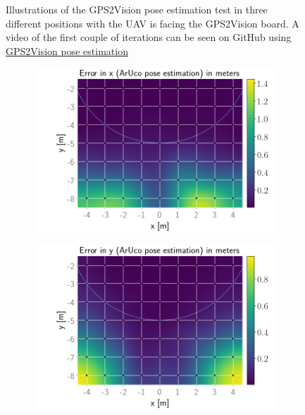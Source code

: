\documentclass[../Head/report.tex]{subfiles}
\begin{document}
\begin{figure}[H]
\begin{subfigure}[t]{.30\textwidth}
        \caption{}
        \label{fig:GPS2Vision_pose_estimation_three}
    \end{subfigure}
    \caption{Illustrations of the GPS2Vision pose estimation test in three different positions with the UAV is facing the GPS2Vision board. A video of the first couple of iterations can be seen on GitHub using \href{https://github.com/Kenil16/master_project/tree/master/test_videos/analyse_GPS2Vision_aruco_pose_estimation}{GPS2Vision pose estimation}
 }
    \label{fig:GPS2Vision_pose_estimation}
\end{figure}

\begin{figure}[H]
    \centering
    \begin{subfigure}[t]{.337\textwidth}
        \centering
        \includegraphics[width=\textwidth]{../Figures/GPS2Vision_pose_estimation_test/test1_aruco_board_width_0.2_space_0.1/aruco_pose_estimation_error_x.png}
        \caption{}
        \label{fig:GPS2Vision_pose_estimation_test1_error_x}
    \end{subfigure}
    \hspace{-0.9em}
    \begin{subfigure}[t]{.337\textwidth}
        \centering
        \includegraphics[width=\textwidth]{../Figures/GPS2Vision_pose_estimation_test/test1_aruco_board_width_0.2_space_0.1/aruco_pose_estimation_error_y.png}

\end{subfigure}
\end{figure}
\end{document}
